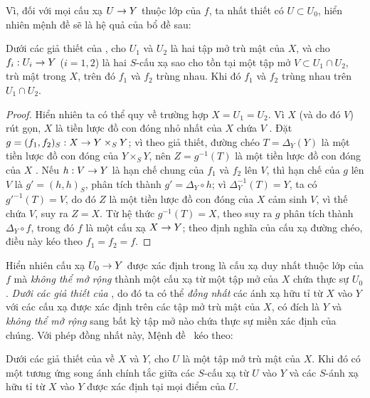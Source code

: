 \documentclass[oneside]{amsart}
\makeatletter
\newcommand{\ega@arrow}[2]{\mathchoice{#1}{#2}{#2}{#2}}
\renewcommand{\to}{\ega@arrow{\longrightarrow}{\rightarrow}}
\let\EGAOriginalLabel\label
\renewcommand{\label}[1]{\phantomsection\EGAOriginalLabel{#1}}
\makeatother
\begin{document}
Vì, đối với mọi cấu xạ $U\to Y$ thuộc lớp của $f$, ta nhất thiết có $U\subset U_0$, hiển nhiên mệnh đề sẽ là hệ quả của bổ đề sau:

\begin{lemma}[7.2.2.1]
\label{I.7.2.2.1}
Dưới các giả thiết của , cho $U_1$ và $U_2$ là hai tập mở trù mật của $X$, và cho $f_i:U_i\to Y$ ($i=1,2$) là hai $S$-cấu xạ sao cho tồn tại một tập mở $V\subset U_1\cap U_2$, trù mật trong $X$, trên đó $f_1$ và $f_2$ trùng nhau.
Khi đó $f_1$ và $f_2$ trùng nhau trên $U_1\cap U_2$.
\end{lemma}

\begin{proof}
Hiển nhiên ta có thể quy về trường hợp $X=U_1=U_2$.
Vì $X$ (và do đó $V$) rút gọn, $X$ là tiền lược đồ con đóng nhỏ nhất của $X$ chứa $V$ .
Đặt $g=(f_1,f_2)_S:X\to Y\times_S Y$; vì theo giả thiết, đường chéo $T=\Delta_Y(Y)$ là một tiền lược đồ con đóng của $Y\times_S Y$, nên $Z=g^{-1}(T)$ là một tiền lược đồ con đóng của $X$ .
Nếu $h:V\to Y$ là hạn chế chung của $f_1$ và $f_2$ lên $V$, thì hạn chế của $g$ lên $V$ là $g'=(h,h)_S$, phân tích thành $g'=\Delta_Y\circ h$; vì $\Delta_Y^{-1}(T)=Y$, ta có $g'^{-1}(T)=V$, do đó $Z$ là một tiền lược đồ con đóng của $X$ cảm sinh $V$, vì thế chứa $V$, suy ra $Z=X$.
Từ hệ thức $g^{-1}(T)=X$, theo  suy ra $g$ phân tích thành $\Delta_Y\circ f$, trong đó $f$ là một cấu xạ $X\to Y$; theo định nghĩa của cấu xạ đường chéo, điều này kéo theo $f_1=f_2=f$.
\end{proof}

Hiển nhiên cấu xạ $U_0\to Y$ được xác định trong  là cấu xạ duy nhất thuộc lớp của $f$ mà \emph{không thể mở rộng} thành một cấu xạ từ một tập mở của $X$ chứa thực sự $U_0$.
\emph{Dưới các giả thiết của }, do đó ta có thể \emph{đồng nhất} các ánh xạ hữu tỉ từ $X$ vào $Y$ với các cấu xạ được xác định trên các tập mở trù mật của $X$, có đích là $Y$ và \emph{không thể mở rộng} sang bất kỳ tập mở nào chứa thực sự miền xác định của chúng.
Với phép đồng nhất này, Mệnh đề~ kéo theo:

\begin{corollary}[7.2.3]
\label{I.7.2.3}
Dưới các giả thiết của  về $X$ và $Y$, cho $U$ là một tập mở trù mật của $X$.
Khi đó có một tương ứng song ánh chính tắc giữa các $S$-cấu xạ từ $U$ vào $Y$ và các $S$-ánh xạ hữu tỉ từ $X$ vào $Y$ được xác định tại mọi điểm của $U$.
\end{corollary}
\end{document}
